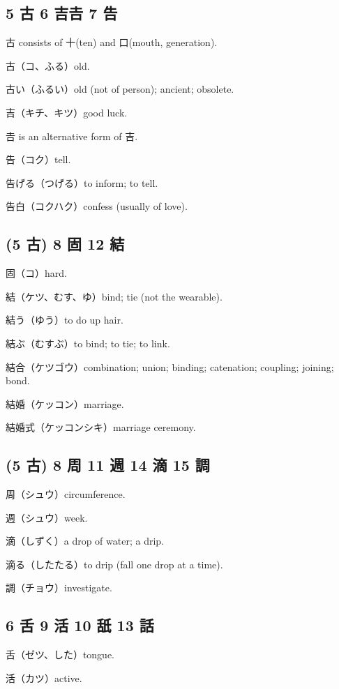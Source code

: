 \subsection{5 古 6 吉𠮷 7 告}

古 consists of 十(ten) and 口(mouth, generation).

古（コ、ふる）old.

古い（ふるい）old (not of person); ancient; obsolete.

吉（キチ、キツ）good luck.

𠮷 is an alternative form of 吉.

告（コク）tell.

告げる（つげる）to inform; to tell.

告白（コクハク）confess (usually of love).

\subsection{(5 古) 8 固 12 結}

固（コ）hard.

結（ケツ、むす、ゆ）bind; tie (not the wearable).

結う（ゆう）to do up hair.

結ぶ（むすぶ）to bind; to tie; to link.

結合（ケツゴウ）combination; union; binding; catenation; coupling; joining; bond.

結婚（ケッコン）marriage.

結婚式（ケッコンシキ）marriage ceremony.

\subsection{(5 古) 8 周 11 週 14 滴 15 調}

周（シュウ）circumference.

週（シュウ）week.

滴（しずく）a drop of water; a drip.

滴る（したたる）to drip (fall one drop at a time).

調（チョウ）investigate.

\subsection{6 舌 9 活 10 舐 13 話}

舌（ゼツ、した）tongue.

活（カツ）active.

